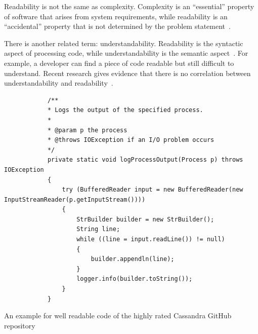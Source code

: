 \documentclass[%
class=scrreprt,
chapterprefix=false,%
open=right,%
twoside=false,%
paper=a4,%
logofile={Logo\_zentral\_farbig\_EN.png},%
thesistype=master,%
UKenglish,%
]{se2thesis}
\begin{document}
	Readability is not the same as complexity. Complexity is an “essential” property of software that arises
	from system requirements, while readability is an “accidental” property that is not determined by the problem statement~\cite{buse2009learning, brooks1987no}.
	
	There is another related term: understandability. Readability is the syntactic aspect of processing code, while understandability is the semantic aspect~\cite{posnett2011simpler}.
	For example, a developer can find a piece of code readable but still difficult to understand. Recent research gives evidence that there is no correlation between understandability and readability~\cite{scalabrino2017automatically}.	
	
	
	\begin{listing}[!ht]
		\begin{verbatim}
			/**
			* Logs the output of the specified process.
			*
			* @param p the process
			* @throws IOException if an I/O problem occurs
			*/
			private static void logProcessOutput(Process p) throws IOException
			{
				try (BufferedReader input = new BufferedReader(new InputStreamReader(p.getInputStream())))
				{
					StrBuilder builder = new StrBuilder();
					String line;
					while ((line = input.readLine()) != null)
					{
						builder.appendln(line);
					}
					logger.info(builder.toString());
				}
			}
		\end{verbatim}
		\caption[An example for well readable code of the highly rated Cassandra GitHub repository]{An example for well readable code of the highly rated Cassandra GitHub repository}
		\label{lst:cassandra-src-java-org-apache-cassandra-utils}
	\end{listing}
	
\end{document}
